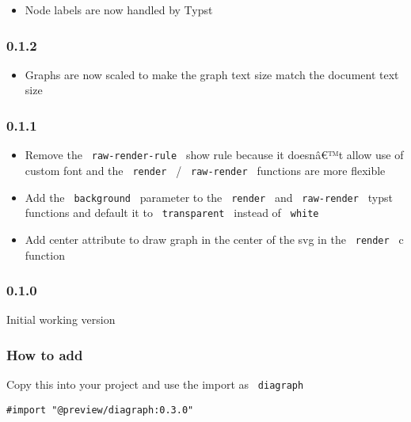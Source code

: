 \begin{itemize}
\tightlist
\item
  Node labels are now handled by Typst
\end{itemize}

\subsubsection{0.1.2}\label{section-7}

\begin{itemize}
\tightlist
\item
  Graphs are now scaled to make the graph text size match the document
  text size
\end{itemize}

\subsubsection{0.1.1}\label{section-8}

\begin{itemize}
\tightlist
\item
  Remove the \texttt{\ raw-render-rule\ } show rule because it doesnâ€™t
  allow use of custom font and the \texttt{\ render\ } /
  \texttt{\ raw-render\ } functions are more flexible
\item
  Add the \texttt{\ background\ } parameter to the \texttt{\ render\ }
  and \texttt{\ raw-render\ } typst functions and default it to
  \texttt{\ transparent\ } instead of \texttt{\ white\ }
\item
  Add center attribute to draw graph in the center of the svg in the
  \texttt{\ render\ } c function
\end{itemize}

\subsubsection{0.1.0}\label{section-9}

Initial working version

\subsubsection{How to add}\label{how-to-add}

Copy this into your project and use the import as \texttt{\ diagraph\ }

\begin{verbatim}
#import "@preview/diagraph:0.3.0"
\end{verbatim}

